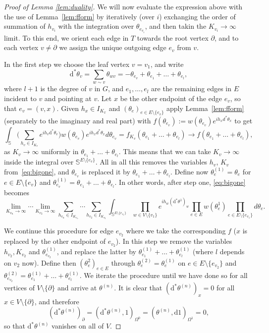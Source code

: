 \documentclass[11pt, reqno]{amsart}
\numberwithin{equation}{section}
\theoremstyle{definition}
\theoremstyle{remark}
\renewcommand{\d}{\mathrm{d}}
\begin{document}
\begin{proof}[Proof of Lemma \ref{lem:duality}]
	We will now evaluate the expression above with the use of Lemma~\ref{lem:fform} by iteratively (over $i$) exchanging the order of summation of $h_{v_i}$ with the integration over $\theta_{e_{v_i}}$, and then takin the $K_{v_i}\to \infty $ limit.
	To this end, we orient each edge in $T$ towards the root vertex $\partial$, and to each vertex $v\neq \partial$ we assign the unique outgoing edge $e_v$ from $v$.
	
	In the first step we choose the leaf vertex $v=v_1$, and write
	\[
		\d^* \theta_v = \sum_{w \sim v} \theta_{wv} = -\theta_{e_v} + \theta_{e_1} + \ldots + \theta_{e_{l}},
	\]
	where $l+1$ is the degree of $v$ in $G$, and $e_1, \ldots, e_l$ are the remaining edges in $E$ incident to $v$ and pointing at $v$. 
	Let $x$ be the other endpoint of the edge $e_{v}$, so that $e_{v} = (v, x)$. 
		Given $h_x \in I_{K_x}$ and $(\theta_e)_{e \in E \setminus \{e_v\}}$ apply Lemma~\ref{lem:fform} (separately to the imaginary and real part) with $f(\theta_{e_v}) := w(\theta_{e_v}) e^{i h_x d^* \theta_x}$ to get
		\[
			\int_{\mathbb S} \Big( \sum_{h_v \in I_{K_v}} e^{i h_v \d^*\theta_v}\Big) w(\theta_{e_v})e^{i h_x d^* \theta_x} {d} \theta_{e_v} = f_{K_v}( \theta_{e_1} + \ldots + \theta_{e_{l}}) \to f( \theta_{e_1} + \ldots + \theta_{e_{l}}), 
		\]
		as $K_v \to \infty$ uniformly in $\theta_{e_1} + \ldots + \theta_{e_l}$. This means that we can take $K_v \to \infty$ inside the integral over $\mathbb{S}^{E \setminus \{e_v\}}$. All in all this removes the variables $h_v$, $K_v$ from~\eqref{eq:bigone}, and $\theta_{e_v}$ is replaced it by $\theta_{e_1} + \ldots + \theta_{e_l}$. Define now $\theta^{(1)}_e = \theta_e$ for $e \in E \setminus \{e_v\}$ and $\theta^{(1)}_{e_v} = \theta_{e_1} + \ldots + \theta_{e_l}$. 
		In other words, after step one, \eqref{eq:bigone} becomes
		\[
			 \lim_{K_{v_n}\to \infty} \cdots  \lim_{K_{v_2}\to \infty} \sum_{h_{v_n}\in I_{K_{v_n}}}\cdots \sum_{h_{v_2}\in I_{K_{v_2}}} \int_{\mathbb S^{E \setminus \{e_{v_1}\}}}  \prod_{w \in V \setminus \{v_1\}} e^{i h_w (\d^*\theta^{1})_w} \prod_{e \in E}w(\theta^{1}_e)\prod_{e \in E \setminus \{e_{v_1}\}} {d}\theta_e. 
		\]
		
		We continue this procedure for edge $e_{v_2}$ where we take the corresponding $f$ ($x$ is replaced by the other endpoint of $e_{v_2}$). 
		In this step we remove the variables $h_{v_2}, K_{v_2}$ and $\theta^{(1)}_{e_{v_2}}$, and replace the latter by $\theta^{(1)}_{e_1} + \ldots + \theta^{(1)}_{e_l}$ (where $l$ depends on $v_2$ now). Define then $(\theta^2_e)_{e \in E}$ through $\theta^{(2)}_e = \theta^{(1)}_e$ on $e \in E \setminus \{e_{v_2}\}$ and 
		$\theta^{(2)}_{e_{v_2}} = \theta^{(1)}_{e_1} + \ldots + \theta^{(1)}_{e_l}$. 
		We iterate the procedure until we have done so for all vertices of $V \setminus \{\partial\}$ and arrive at $\theta^{(n)}$. 
		It is clear that $(\d^* \theta^{(n)})_x = 0$ for all $x \in V \setminus \{\partial \}$, and therefore
		\[
			(\d^* \theta^{(n)})_{\partial} = (\d^*\theta^{(n)}, 1)_{\Omega^0} = (\theta^{(n)}, \d 1)_{\Omega^1} = 0, 
		\]
		so that $\d^* \theta^{(n)}$ vanishes on all of $V$. 
		

\end{proof}
\end{document}
